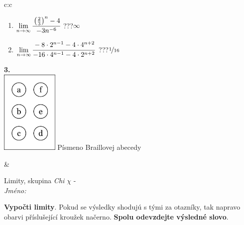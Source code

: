 \documentclass[10pt]{report}
\begin{document}
\begin{tabular}{c:c}
\begin{minipage}[c][104.5mm][t]{0.5\linewidth}
\begin{center}
\begin{minipage}{0.79\linewidth}
\begin{center}
\begin{varwidth}{\linewidth}
\begin{enumerate}
\item $\lim\limits_{n\to\infty}\cfrac{\left(\frac{2}{3}\right)^n -4}{-3n^{-6}}$\quad \dotfill\; ???\;\dotfill \quad $\infty$
\item $\lim\limits_{n\to\infty}\cfrac{-8\cdot 2^{n-1}-4\cdot 4^{n+2}}{-16\cdot 4^{n-1}-4\cdot 2^{n+2}}$\quad \dotfill\; ???\;\dotfill \quad $\nicefrac{1}{16}$
\end{enumerate}
\end{varwidth}
\end{center}
\end{minipage}
\begin{minipage}{0.20\linewidth}
\begin{center}
{\Huge\bfseries 3.} \\[2mm]
\includegraphics[height=40mm]{../images/braille.png}
{\small Písmeno Braillovej abecedy}
\end{center}
\end{minipage}
\end{center}
\end{minipage}
&
\begin{minipage}[c][104.5mm][t]{0.5\linewidth}
\begin{center}
\vspace{7mm}
{\huge Limity, skupina \textit{Chi $\chi$} -}\\[5mm]
\textit{Jméno:}\phantom{xxxxxxxxxxxxxxxxxxxxxxxxxxxxxxxxxxxxxxxxxxxxxxxxxxxxxxxxxxxxxxxxx}\\[5mm]
\begin{minipage}{0.95\linewidth}
\begin{center}
\textbf{Vypočti limity}. Pokud se výsledky shodujú s tými za otazníky, tak napravo\\obarvi příslušející kroužek načerno. \textbf{Spolu odevzdejte výsledné slovo}.
\end{center}
\end{minipage}
\\[1mm]
\begin{minipage}{0.79\linewidth}
\begin{center}
\begin{varwidth}{\linewidth}

\end{varwidth}
\end{center}
\end{minipage}
\end{center}
\end{minipage}
\end{tabular}
\end{document}
